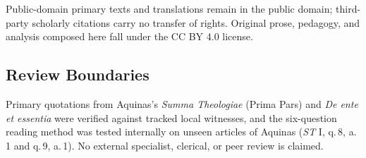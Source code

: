 Public-domain primary texts and translations remain in the public domain; third-party scholarly citations carry no transfer of rights. Original prose, pedagogy, and analysis composed here fall under the CC BY 4.0 license.

\subsection*{Review Boundaries}

Primary quotations from Aquinas's \emph{Summa Theologiae} (Prima Pars) and \emph{De ente et essentia} were verified against tracked local witnesses, and the six-question reading method was tested internally on unseen articles of Aquinas (\emph{ST} I, q.\,8, a.\,1 and q.\,9, a.\,1). No external specialist, clerical, or peer review is claimed.
